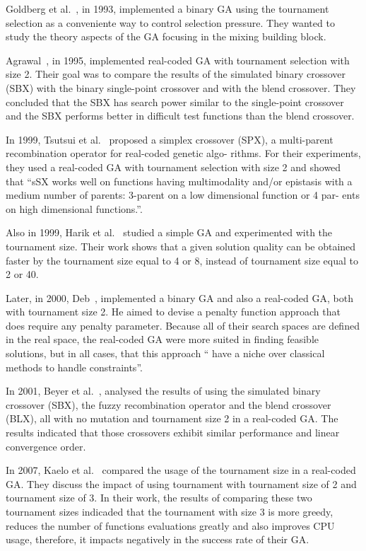 Goldberg et al.~\cite{goldberg1993toward}, in 1993, implemented a binary GA using the tournament selection as a conveniente way to control selection pressure. They wanted to study the theory aspects of the GA focusing in the mixing building block.

Agrawal~\cite{agrawal1995simulated}, in 1995, implemented real-coded GA with tournament selection with size 2. Their goal was to compare the results of the simulated binary crossover (SBX) with the binary single-point crossover and with the blend crossover. They concluded that the SBX  has search power similar to the single-point crossover and the SBX performs better in difficult test functions than the blend crossover. 

In 1999, Tsutsui et al.~\cite{tsutsui1999multi} proposed a simplex crossover (SPX), a multi-parent recombination operator for real-coded genetic algo- rithms. For their experiments, they used a real-coded GA with tournament selection with size 2 and showed that ``sSX works well on functions having multimodality and/or epistasis with a medium number of parents: 3-parent on a low dimensional function or 4 par- ents on high dimensional functions.''.

Also in 1999, Harik et al.~\cite{harik1999compact} studied a simple GA and experimented with the tournament size. Their work shows that a given solution quality can be obtained faster by the tournament size equal to 4 or 8, instead of tournament size equal to 2 or 40.

Later, in 2000, Deb~\cite{deb2000efficient}, implemented a binary GA and also a real-coded GA, both with tournament size 2. He aimed to devise a penalty function approach that does require any penalty parameter. Because all of their search spaces are defined in the real space, the real-coded GA were more suited in finding feasible solutions, but in all cases, that this approach `` have a niche over classical methods to handle constraints''.


In 2001, Beyer et al.~\cite{beyer2001self}, analysed the results of using the simulated binary crossover (SBX), the fuzzy recombination operator and the blend crossover (BLX), all with no mutation and tournament size 2 in a real-coded GA. The results indicated that those crossovers exhibit similar performance and linear convergence order.


In 2007, Kaelo et al.~\cite{kaelo2007integrated} compared the usage of the tournament size in a real-coded GA. They discuss the impact of using tournament with tournament size of 2 and tournament size of 3. In their work, the results of comparing these two tournament sizes indicaded that the tournament with size 3 is more greedy, reduces the number of functions evaluations greatly and also improves CPU usage, therefore, it impacts negatively in the success rate of their GA.

